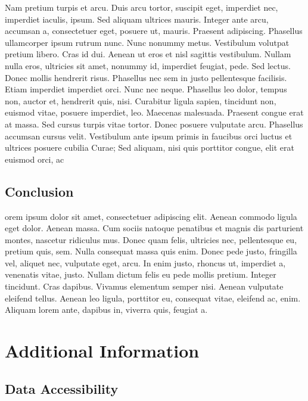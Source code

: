 \documentclass[]{cik}%
\begin{document}
Nam pretium turpis et arcu. Duis arcu tortor, suscipit eget, imperdiet
nec, imperdiet iaculis, ipsum. Sed aliquam ultrices mauris. Integer ante
arcu, accumsan a, consectetuer eget, posuere ut, mauris. Praesent
adipiscing. Phasellus ullamcorper ipsum rutrum nunc. Nunc nonummy metus.
Vestibulum volutpat pretium libero. Cras id dui. Aenean ut eros et nisl
sagittis vestibulum. Nullam nulla eros, ultricies sit amet, nonummy id,
imperdiet feugiat, pede. Sed lectus. Donec mollis hendrerit risus.
Phasellus nec sem in justo pellentesque facilisis. Etiam imperdiet
imperdiet orci. Nunc nec neque. Phasellus leo dolor, tempus non, auctor
et, hendrerit quis, nisi. Curabitur ligula sapien, tincidunt non,
euismod vitae, posuere imperdiet, leo. Maecenas malesuada. Praesent
congue erat at massa. Sed cursus turpis vitae tortor. Donec posuere
vulputate arcu. Phasellus accumsan cursus velit. Vestibulum ante ipsum
primis in faucibus orci luctus et ultrices posuere cubilia Curae; Sed
aliquam, nisi quis porttitor congue, elit erat euismod orci, ac

\hypertarget{conclusion}{%
\subsection{Conclusion}\label{conclusion}}

orem ipsum dolor sit amet, consectetuer adipiscing elit. Aenean commodo
ligula eget dolor. Aenean massa. Cum sociis natoque penatibus et magnis
dis parturient montes, nascetur ridiculus mus. Donec quam felis,
ultricies nec, pellentesque eu, pretium quis, sem. Nulla consequat massa
quis enim. Donec pede justo, fringilla vel, aliquet nec, vulputate eget,
arcu. In enim justo, rhoncus ut, imperdiet a, venenatis vitae, justo.
Nullam dictum felis eu pede mollis pretium. Integer tincidunt. Cras
dapibus. Vivamus elementum semper nisi. Aenean vulputate eleifend
tellus. Aenean leo ligula, porttitor eu, consequat vitae, eleifend ac,
enim. Aliquam lorem ante, dapibus in, viverra quis, feugiat a.

\newpage

\hypertarget{additional-information}{%
\section{Additional Information}\label{additional-information}}

\hypertarget{data-accessibility}{%
\subsection{Data Accessibility}\label{data-accessibility}}
\end{document}
